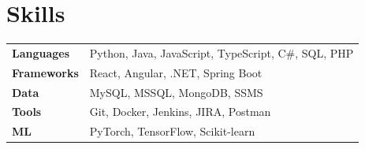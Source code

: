 \documentclass[10pt, letterpaper]{article}
\begin{document}
\section{Skills}

\vspace{1pt}
\begin{tabularx}{\linewidth}{@{}>{\bfseries\small}l X@{}}
  Languages & \small Python, Java, JavaScript, TypeScript, C\#, SQL, PHP \\[3pt]
  Frameworks & \small React, Angular, .NET, Spring Boot \\[3pt]
  Data & \small MySQL, MSSQL, MongoDB, SSMS \\[3pt]
  Tools & \small Git, Docker, Jenkins, JIRA, Postman \\[3pt]
  ML & \small PyTorch, TensorFlow, Scikit-learn \\
\end{tabularx}
\end{document}
